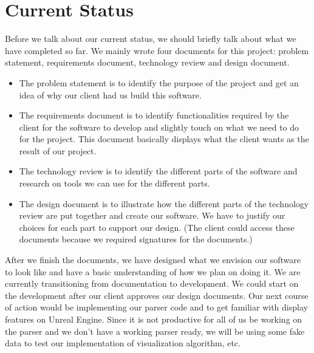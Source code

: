 \documentclass[onecolumn, draftclsnofoot, 10pt, compsoc]{IEEEtran}
\begin{document}
\section{Current Status}
\begin{singlespace}
Before we talk about our current status, we should briefly talk about what we have completed so far. We mainly wrote four documents for this project: problem statement, requirements document, technology review and design document.
\begin{itemize}
\item The problem statement is to identify the purpose of the project and get an idea of why our client had us build this software.
\item The requirements document is to identify functionalities required by the client for the software to develop and slightly touch on what we need to do for the project. This document basically displays what the client wants as the result of our project. 
\item The technology review is to identify the different parts of the software and research on tools we can use for the different parts.
\item The design document is to illustrate how the different parts of the technology review are put together and create our software. We have to justify our choices for each part to support our design. (The client could access these documents because we required signatures for the documents.)
\end{itemize}
 

After we finish the documents, we have designed what we envision our software to look like and have a basic understanding of how we plan on doing it. We are currently transitioning from documentation to development. We could start on the development after our client approves our design documents. Our next course of action would be implementing our parser code and to get familiar with display features on Unreal Engine. Since it is not productive for all of us be working on the parser and we don't have a working parser ready, we will be using some fake data to test our implementation of visualization algorithm, etc.
\end{singlespace}
\end{document}
